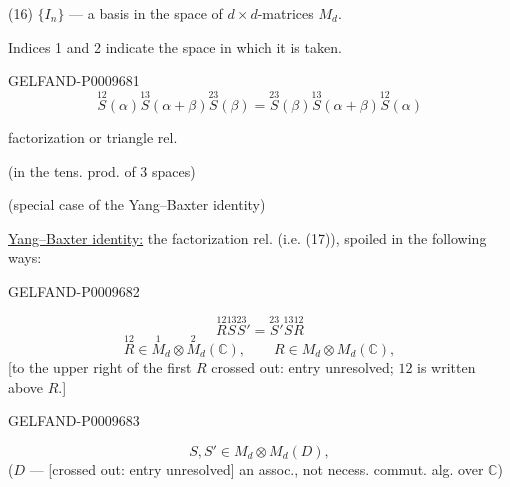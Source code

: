 (16) $\{I_n\}$ --- a basis in the space of $d\times d$-matrices $M_d$.

Indices 1 and 2 indicate the space in which it is taken.

\begin{GelfandAdjacentEvidence}{GELFAND-P000968}{1}
\begin{equation*}
 \overset{12}{S}(\alpha)\overset{13}{S}(\alpha+\beta)\overset{23}{S}(\beta)
 =\overset{23}{S}(\beta)\overset{13}{S}(\alpha+\beta)\overset{12}{S}(\alpha)
 \tag{17}
\end{equation*}
\begin{flushright}factorization or triangle rel.\end{flushright}
(in the tens. prod. of 3 spaces)

(special case of the Yang–Baxter identity)

\underline{Yang–Baxter identity:} the factorization rel. (i.e. (17)), spoiled in the following ways:
\end{GelfandAdjacentEvidence}
\begin{GelfandAdjacentEvidence}{GELFAND-P000968}{2}

\begin{equation*}
 \overset{12}{R}\overset{13}{S}\overset{23}{S}'
 =\overset{23}{S}'\overset{13}{S}\overset{12}{R}\tag{18}
\end{equation*}
\begin{equation*}
 \overset{12}{R}\in\overset{1}{M}_d\otimes\overset{2}{M}_d(\mathbb C),\qquad
 R\in M_d\otimes M_d(\mathbb C),\tag{19}
\end{equation*}
[to the upper right of the first $R$ crossed out: entry unresolved; $12$ is written above $R$.]
\end{GelfandAdjacentEvidence}
\begin{GelfandAdjacentEvidence}{GELFAND-P000968}{3}

\begin{equation*}
 S,S'\in M_d\otimes M_d(D),\tag{20}
\end{equation*}
($D$ --- [crossed out: entry unresolved] an assoc., not necess. commut. alg. over $\mathbb C$)
\end{GelfandAdjacentEvidence}
